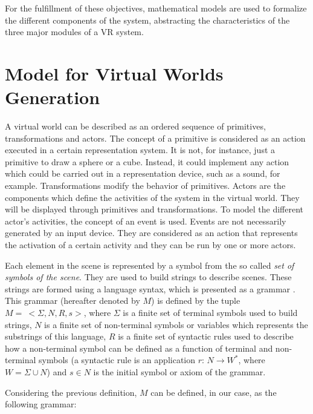 \documentclass[twocolumn]{svjour3}
\begin{document}
For the fulfillment of these objectives, mathematical models are used to formalize the different
components of the system, abstracting the characteristics of the three major modules of a VR
system.




\section{Model for Virtual Worlds Generation
\label{sec:model}}

A virtual world can be described as an ordered sequence of primitives, transformations and actors.
The concept of a primitive is considered as an action executed in a certain representation system.
It is not, for instance, just a primitive to draw a sphere or a cube. Instead, it could implement
any action which could be carried out in a representation device, such as a sound, for example.
Transformations modify the behavior of primitives. Actors are the components which define the
activities of the system in the virtual world. They will be displayed through primitives and
transformations. To model the different actor's activities, the concept of an event is used. Events
are not necessarily generated by an input device. They are considered as an action that represents
the activation of a certain activity and they can be run by one or more actors.

Each element in the scene is represented by a symbol from the so called \textit{set of symbols of
the scene}. They are used to build strings to describe scenes. These strings are formed using a
language syntax, which is presented as a grammar \cite{Davis1994}. This grammar (hereafter denoted
by $M$) is defined by the tuple $M= \ <\Sigma, N, R, s>$, where $\Sigma$ is a finite set of
terminal symbols used to build strings, $N$ is a finite set of non-terminal symbols or variables
which represents the substrings of this language, $R$ is a finite set of syntactic rules used to
describe how a non-terminal symbol can be defined as a function of terminal and non-terminal
symbols (a syntactic rule is an application $r$: $N \rightarrow W^*$, where $W = \Sigma \cup N$)
and $s \in N$ is the initial symbol or axiom of the grammar.

Considering the previous definition, $M$ can be defined, in our case, as the following grammar:
\end{document}
